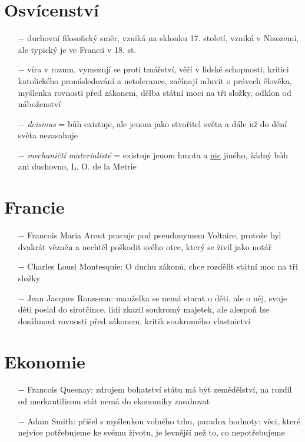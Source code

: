 \documentclass{article}
\begin{document}
\section*{Osvícenství}
\begin{itemize}
    \vspace{-0.5em}
    \setlength\itemsep{0.15em}
    \item[$-$] duchovní filosofický směr, vzniká na sklonku 17. století, vzniká v Nizozemí, ale typický je ve Francii v 18. st.
    \item[$-$] víra v rozum, vymezují se proti tmářství, věří v lidské schopnosti, kritici katolického pronásledování a netolerance, začínají mluvit o právech člověka, myšlenka rovnosti před zákonem, dělba státní moci na tři složky, odklon od náboženství
    \item[$-$] \textit{deismus} = bůh existuje, ale jenom jako stvořitel světa a dále už do dění světa nezasahuje
    \item[$-$] \textit{mechaničtí materialisté} = existuje jenom hmota a \underline{nic} jiného, žádný bůh ani duchovno, L. O. de la Metrie


\end{itemize}

\section*{Francie}
\begin{itemize}
    \vspace{-0.5em}
    \setlength\itemsep{0.15em}
    \item[$-$] Francois Maria Arout pracuje pod pseudonymem Voltaire, protože byl dvakrát vězněn a nechtěl poškodit svého otce, který se živil jako notář
    \item[$-$] Charles Lousi Montesquie: O duchu zákonů, chce rozdělit státní moc na tři složky
    \item[$-$] Jean Jacques Rousseau: manželka se nemá starat o děti, ale o něj, svoje děti poslal do sirotčince, lidi zkazil soukromý majetek, ale alespoň lze dosáhnout rovnosti před zákonem, kritik soukromého vlastnictví
\end{itemize}
\section*{Ekonomie}
\begin{itemize}
    \vspace{-0.5em}
    \setlength\itemsep{0.15em}
    \item[$-$] Francois Quesnay: zdrojem bohatství státu má být zemědělství, na rozdíl od merkantilismu stát nemá do ekonomiky zasahovat
    \item[$-$] Adam Smith: přišel s myšlenkou volného trhu, paradox hodnoty: věci, které nejvíce potřebujeme ke svému životu, je levnější než to, co nepotřebujeme
\end{itemize}
\end{document}
